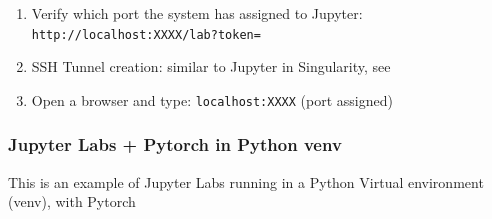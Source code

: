\begin{itemize}
\begin{enumerate}
\begin{verbatim}
setenv TMP /speed-scratch/$USER/tmp
setenv CONDA_PKGS_DIRS /speed-scratch/$USER/Jupyter/pkgs
conda activate /speed-scratch/$USER/Jupyter/jupyter-env
jupyter lab --no-browser --notebook-dir=$PWD --ip="*" --port=8888 --port-retries=50
\end{verbatim}
\normalsize
\item
Verify which port the system has assigned to Jupyter: 
\texttt{http://localhost:XXXX/lab?token=}
\item
SSH Tunnel creation: similar to Jupyter in Singularity, see 
\item
Open a browser and type: \texttt {localhost:XXXX} (port assigned)
\end{enumerate}
\end{itemize}

\subsubsection{Jupyter Labs + Pytorch in Python venv}
\label{sect:jupiterlabs-venv}

This is an example of Jupyter Labs running in a Python Virtual environment (venv), with Pytorch

